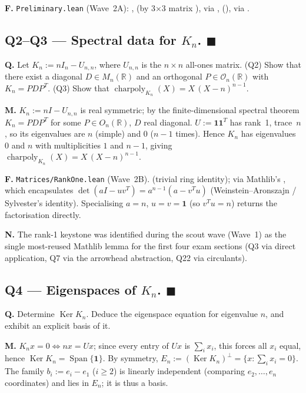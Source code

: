 \documentclass[11pt,a4paper]{article}
\newcommand{\done}[1]{\textcolor{donegreen}{\textbf{#1}}}
\newcommand{\lmod}[1]{\texttt{\small #1}}
\newcommand{\R}{\mathbb{R}}
\newcommand{\Span}{\operatorname{Span}}
\newcommand{\charpoly}{\operatorname{charpoly}}
\newcommand{\Ker}{\operatorname{Ker}}
\theoremstyle{plain}
\theoremstyle{definition}
\begin{document}
\textbf{F.} \lmod{Preliminary.lean} (Wave~2A):
,  (by 3$\times$3 matrix
),  via
, 
(),
 via
.

\subsection{Q2--Q3 --- Spectral data for $K_n$. \done{$\blacksquare$}}

\textbf{Q.} Let $K_n := n I_n - U_{n,n}$, where $U_{n,n}$ is the
$n \times n$ all-ones matrix. (Q2) Show that there exist a diagonal
$D \in M_n(\R)$ and an orthogonal $P \in \mathcal O_n(\R)$ with
$K_n = P D P^T$. (Q3) Show that
$\charpoly_{K_n}(X) = X\,(X-n)^{n-1}$.

\textbf{M.} $K_n := n I - U_{n,n}$ is real symmetric; by the
finite-dimensional spectral theorem $K_n = P D P^T$ for some
$P \in O_n(\R)$, $D$ real diagonal. $U := \mathbf 1 \mathbf 1^T$
has rank~1, trace~$n$, so its eigenvalues are $n$ (simple) and $0$
($n-1$ times). Hence $K_n$ has eigenvalues $0$ and $n$ with
multiplicities $1$ and $n-1$, giving
$\charpoly_{K_n}(X) = X\,(X-n)^{n-1}$.

\textbf{F.} \lmod{Matrices/RankOne.lean} (Wave~2B).
 (trivial ring identity);
 via Mathlib's
, which encapsulates
$\det(a I - u v^T) = a^{n-1}(a - v^T u)$ (Weinstein--Aronszajn /
Sylvester's identity). Specialising $a = n$, $u = v = \mathbf 1$
(so $v^T u = n$) returns the factorisation directly.

\textbf{N.} The rank-1 keystone was identified during the
scout wave (Wave~1) as the single most-reused Mathlib lemma for
the first four exam sections (Q3 via direct application, Q7 via
the arrowhead abstraction, Q22 via circulants).

\subsection{Q4 --- Eigenspaces of $K_n$. \done{$\blacksquare$}}

\textbf{Q.} Determine $\Ker K_n$. Deduce the eigenspace equation
for eigenvalue $n$, and exhibit an explicit basis of it.

\textbf{M.} $K_n x = 0 \iff n x = U x$; since every entry of $U x$
is $\sum_i x_i$, this forces all $x_i$ equal, hence
$\Ker K_n = \Span\{\mathbf 1\}$. By symmetry,
$E_n := (\Ker K_n)^\perp = \{x : \sum_i x_i = 0\}$. The family
$b_i := e_i - e_1$ ($i \geq 2$) is linearly independent
(comparing $e_2, \ldots, e_n$ coordinates) and lies in $E_n$; it
is thus a basis.
\end{document}

